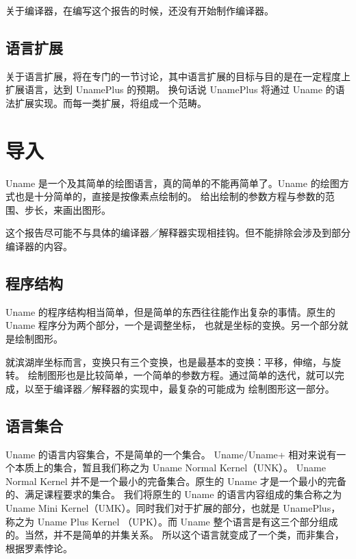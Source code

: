 \documentclass{ctexart}
\begin{document}
关于编译器，在编写这个报告的时候，还没有开始制作编译器。

\subsection{语言扩展}
\label{sec:preface:extension}

关于语言扩展，将在专门的一节讨论，其中语言扩展的目标与目的是在一定程度上扩展语言，达到 UnamePlus 的预期。
换句话说 UnamePlus 将通过 Uname 的语法扩展实现。而每一类扩展，将组成一个范畴。

\section{导入}
\label{sec:intro}

Uname 是一个及其简单的绘图语言，真的简单的不能再简单了。Uname 的绘图方式也是十分简单的，直接是按像素点绘制的。
给出绘制的参数方程与参数的范围、步长，来画出图形。

这个报告尽可能不与具体的编译器／解释器实现相挂钩。但不能排除会涉及到部分编译器的内容。

\subsection{程序结构}
\label{sec:intro:structure}

Uname 的程序结构相当简单，但是简单的东西往往能作出复杂的事情。原生的 Uname 程序分为两个部分，一个是调整坐标，
也就是坐标的变换。另一个部分就是绘制图形。

就滨湖岸坐标而言，变换只有三个变换，也是最基本的变换：平移，伸缩，与旋转。
绘制图形也是比较简单，一个简单的参数方程。通过简单的迭代，就可以完成，以至于编译器／解释器的实现中，最复杂的可能成为
绘制图形这一部分。

\subsection{语言集合}
\label{sec:intro:langset}

Uname 的语言内容集合，不是简单的一个集合。 Uname/Uname+ 相对来说有一个本质上的集合，暂且我们称之为 Uname Normal Kernel（UNK）。
Uname Normal Kernel 并不是一个最小的完备集合。原生的 Uname 才是一个最小的完备的、满足课程要求的集合。
我们将原生的 Uname 的语言内容组成的集合称之为 Uname Mini Kernel（UMK）。同时我们对于扩展的部分，也就是 UnamePlus，
称之为 Uname Plus Kernel （UPK）。而 Uname 整个语言是有这三个部分组成的。当然，并不是简单的并集关系。
所以这个语言就变成了一个类，而非集合，根据罗素悖论。
\end{document}
